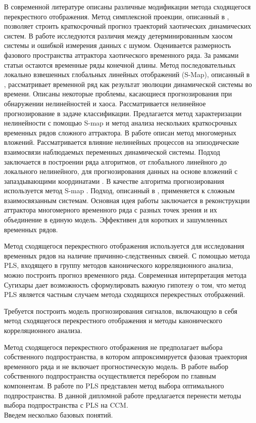 \documentclass[12pt]{extarticle}
\begin{document}
В современной литературе описаны различные модификации метода сходящегося перекрестного отображения. Метод симплексной проекции, описанный в \cite{sugihara1990nonlinear}, позволяет строить краткосрочный прогноз траекторий хаотических динамических систем. В работе исследуются различия между детерминированным хаосом системы и ошибкой измерения данных с шумом. Оценивается размерность фазового пространства аттрактора хаотического временного ряда. За рамками статьи остаются временные ряды конечной длины. 
Метод последовательных локально взвешенных глобальных линейных отображений (S-Map), описанный в \cite{sugihara1994nonlinear}, рассматривает временной ряд как результат эволюции динамической системы во времени. Описаны некоторые проблемы, касающиеся прогнозирования при обнаружении нелинейностей и хаоса. Рассматривается нелинейное прогнозирование в задаче классификации. Предлагается метод характеризации нелинейности с помощью S-map и метод анализа нескольких краткосрочных временных рядов сложного аттрактора. В работе \cite{dixon1999episodic} описан метод многомерных вложений. Рассматривается влияние нелинейных процессов на эпизодические взаимосвязи наблюдаемых переменных динамической системы. Подход заключается в построении ряда алгоритмов, от глобального линейного до локального нелинейного, для прогнозирования данных на основе вложений с запаздывающими координатами \cite{rand2006dynamical}. В качестве алгоритма прогнозирования используется метод S-map \cite{sugihara1994nonlinear}.
Подход, описанный в \cite{ye2016information}, применяется к сложным взаимосвязанным системам. Основная идея работы заключается в реконструкции аттрактора многомерного временного ряда с разных точек зрения и их объединение в единую модель. Эффективен для коротких и зашумленных временных рядов.

Метод сходящегося перекрестного отображения используется для исследования временных рядов на наличие причинно-следственных связей. С помощью метода PLS, входящего в группу методов канонического корреляционного анализа, можно построить прогноз временного ряда. Современная интерпретация метода Сугихары дает возможность сформулировать важную  гипотезу о том, что метод PLS является частным случаем метода сходящихся перекрестных отображений.

Требуется построить модель прогнозирования сигналов, включающую в себя метод сходящегося перекрестного отображения и методы канонического корреляционного анализа.

Метод сходящегося перекрестного отображения не предполагает выбора собственного
подпространства, в котором аппроксимируется фазовая траектория временного ряда и не включает
прогностическую модель. В работе \cite{usmanova} выбор собственного подпространства осуществляется перебором по главным компонентам. В работе \cite{Isachenko2021PhDThesis} по PLS представлен метод выбора оптимального подпространства. В данной дипломной работе предлагается перенести методы выбора подпространства с PLS на CCM.\\
Введем несколько базовых понятий.
\end{document}
